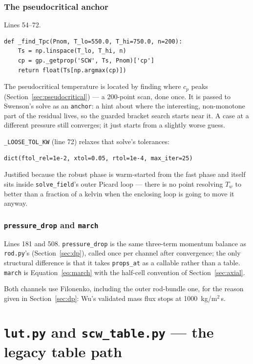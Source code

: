 \documentclass[11pt]{article}
\newcommand{\code}[1]{\texttt{#1}}
\begin{document}
\section{The pseudocritical anchor}
Lines 54--72.
\begin{lstlisting}
def _find_Tpc(Pnom, T_lo=550.0, T_hi=750.0, n=200):
    Ts = np.linspace(T_lo, T_hi, n)
    cp = gp._getprop('SCW', Ts, Pnom)['cp']
    return float(Ts[np.argmax(cp)])
\end{lstlisting}
The pseudocritical temperature is located by finding where $c_p$ peaks
(Section~\ref{sec:pseudocritical}) --- a 200-point scan, done once. It is passed to
Swenson's solve as an \code{anchor}: a hint about where the interesting, non-monotone
part of the residual lives, so the guarded bracket search starts near it. A case at a
different pressure still converges; it just starts from a slightly worse guess.

\code{\_LOOSE\_TOL\_KW} (line 72) relaxes that solve's tolerances:
\begin{lstlisting}
dict(ftol_rel=1e-2, xtol=0.05, rtol=1e-4, max_iter=25)
\end{lstlisting}
Justified because the robust phase is warm-started from the fast phase and itself sits
inside \code{solve\_field}'s outer Picard loop --- there is no point resolving $T_w$ to
better than a fraction of a kelvin when the enclosing loop is going to move it anyway.

\section{\code{pressure\_drop} and \code{march}}
Lines 181 and 508. \code{pressure\_drop} is the same three-term momentum balance as
\code{rod.py}'s (Section~\ref{sec:dp}), called once per channel after convergence; the
only structural difference is that it takes \code{props\_at} as a callable rather than a
table. \code{march} is Equation~\eqref{eq:march} with the half-cell convention of
Section~\ref{sec:axial}.

Both channels use Filonenko, including the outer rod-bundle one, for the reason given in
Section~\ref{sec:dp}: Wu's validated mass flux stops at 1000~kg/m$^2$\,s.

\newpage
\part{\code{lut.py} and \code{scw\_table.py} --- the legacy table path}
\label{part:legacy}
\end{document}
